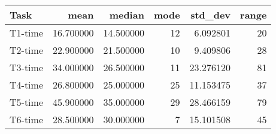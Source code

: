 \begin{tabular}{lrrrrr}
\toprule
Task & mean & median & mode & std_dev & range \\
\midrule
T1-time & 16.700000 & 14.500000 & 12 & 6.092801 & 20 \\
T2-time & 22.900000 & 21.500000 & 10 & 9.409806 & 28 \\
T3-time & 34.000000 & 26.500000 & 11 & 23.276120 & 81 \\
T4-time & 26.800000 & 25.000000 & 25 & 11.153475 & 37 \\
T5-time & 45.900000 & 35.000000 & 29 & 28.466159 & 79 \\
T6-time & 28.500000 & 30.000000 & 7 & 15.101508 & 45 \\
\bottomrule
\end{tabular}
